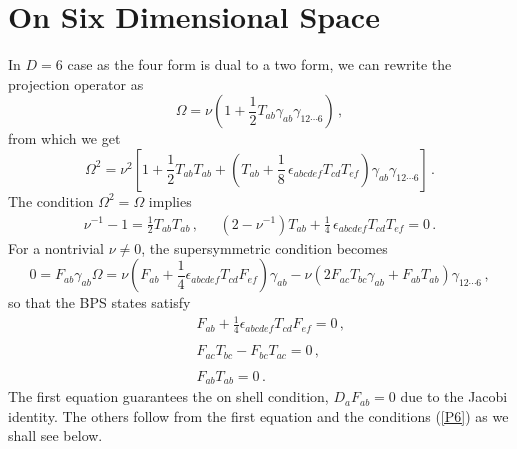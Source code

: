 \documentclass[a4paper,11pt]{article}
\newcommand{\const}{{\nu}}
\def\const{{\nu}}
\begin{document}
\section{On Six Dimensional Space\label{SIX}}
In $D=6$ case as the four form is dual to a two form, we can rewrite the  projection operator as
\begin{equation}
\Omega=\const\left(1+\frac{1}{2}T_{ab}\gamma_{ab}\gamma_{12\cdots6}\right)\,,
\end{equation}
from which we get
\begin{equation}
\Omega^{2}=\const^{2}\left[1+\textstyle{\frac{1}{2}}T_{ab}T_{ab}+(T_{ab}+\textstyle{\frac{1}{8}}\,
\epsilon_{abcdef}T_{cd}T_{ef})\gamma_{ab}\gamma_{12\cdots6}\right]\,.
\end{equation}
The condition  $\Omega^{2}=\Omega$ implies
\begin{equation}
\begin{array}{cc}
\const^{-1}-1=\frac{1}{2}T_{ab}T_{ab}\,,
~&~~(2-\const^{-1})T_{ab}+\frac{1}{4}\,\epsilon_{abcdef}T_{cd}T_{ef}=0\,.
\end{array}
\label{P6}
\end{equation}
For a nontrivial $\const\neq 0$, the supersymmetric condition becomes
\begin{equation}
0=F_{ab}\gamma_{ab}\Omega=\const (F_{ab}+\frac{1}{4}\epsilon_{abcdef}T_{cd}F_{ef})\gamma_{ab}- \const
(2F_{ac}T_{bc}\gamma_{ab}+F_{ab}T_{ab})\gamma_{12\cdots 6}\,,
\end{equation}
so that the BPS states satisfy
\begin{eqnarray}
&&F_{ab}+\frac{1}{4}\epsilon_{abcdef}T_{cd}F_{ef}=0\,,\label{6BPS1}\\ {}\nonumber\\
&&F_{ac}T_{bc}-F_{bc}T_{ac}=0\,,\label{6BPS2}\\ {}\nonumber\\ &&F_{ab}T_{ab}=0\,.\label{6BPS3}
\end{eqnarray}
The first equation guarantees the on shell condition, $D_{a}F_{ab}=0$ due to the Jacobi identity.    The others follow from
the first equation and the conditions (\ref{P6}) as we shall see below. \\
\end{document}
